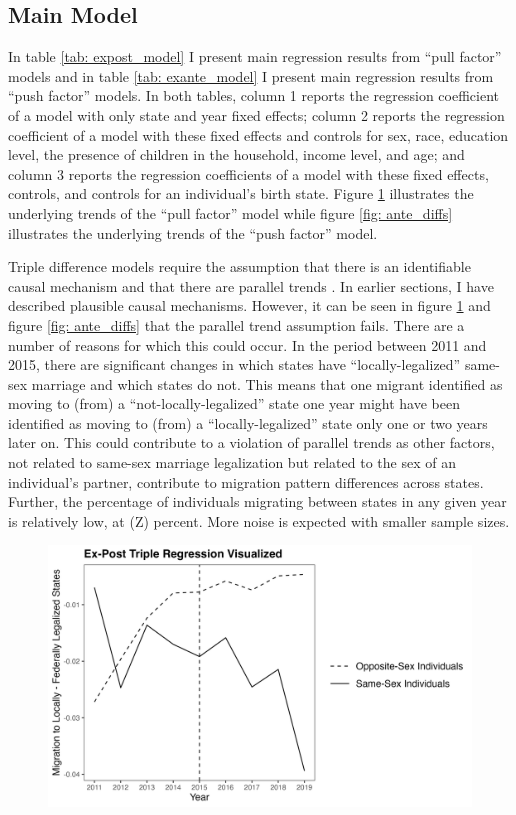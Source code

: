 \documentclass[12pt,letterpaper]{article}
\begin{document}
\clearpage
\subsection{Main Model} %
In table \ref{tab: expost_model} I present main regression results from “pull factor” models and in table \ref{tab: exante_model} I present main regression results from “push factor” models. In both tables, column 1 reports the regression coefficient of a model with only state and year fixed effects; column 2 reports the regression coefficient of a model with these fixed effects and controls for sex, race, education level, the presence of children in the household, income level, and age; and column 3 reports the regression coefficients of a model with these fixed effects, controls, and controls for an individual’s birth state. Figure \ref{fig: post_diffs} illustrates the underlying trends of the “pull factor” model while figure \ref{fig: ante_diffs} illustrates the underlying trends of the “push factor” model. 

Triple difference models require the assumption that there is an identifiable causal mechanism and that there are parallel trends \citep{24, 25}. In earlier sections, I have described plausible causal mechanisms. However, it can be seen in figure \ref{fig: post_diffs} and figure \ref{fig: ante_diffs} that the parallel trend assumption fails. There are a number of reasons for which this could occur. In the period between 2011 and 2015, there are significant changes in which states have “locally-legalized” same-sex marriage and which states do not. This means that one migrant identified as moving to (from) a “not-locally-legalized” state one year might have been identified as moving to (from) a “locally-legalized” state only one or two years later on. This could contribute to a violation of parallel trends as other factors, not related to same-sex marriage legalization but related to the sex of an individual’s partner, contribute to migration pattern differences across states. Further, the percentage of individuals migrating between states in any given year is relatively low, at (Z) percent. More noise is expected with smaller sample sizes. 


\begin{figure}[h]
    \centering
    \includegraphics[width=0.75\linewidth]{outputs/summary_stats/post_diffs.png}
    \caption{}
    \label{fig: post_diffs}
\end{figure}
\end{document}

